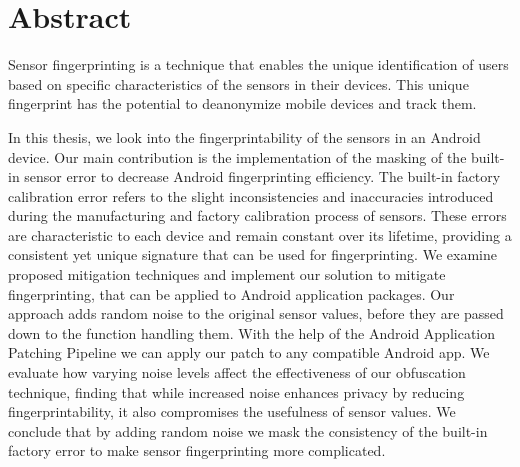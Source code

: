 \documentclass[11pt,
  oneside,openany,    %
]{scrreprt}
\begin{document}









\printthesistitle

\chapter*{Abstract}

Sensor fingerprinting is a technique that enables the unique identification of users based on specific characteristics of the sensors in their devices. 
This unique fingerprint has the potential to deanonymize mobile devices and track them.

In this thesis, we look into the fingerprintability of the sensors in an Android device.
Our main contribution is the implementation of the masking of the built-in sensor error to decrease Android fingerprinting efficiency.
The built-in factory calibration error refers to the slight inconsistencies and inaccuracies introduced during the manufacturing and factory calibration process of sensors. 
These errors are characteristic to each device and remain constant over its lifetime, providing a consistent yet unique signature that can be used for fingerprinting.
We examine proposed mitigation techniques and implement our solution to mitigate fingerprinting, that can be applied to Android application packages.
Our approach adds random noise to the original sensor values, before they are passed down to the function handling them.
With the help of the Android Application Patching Pipeline we can apply our patch to any compatible Android app.
We evaluate how varying noise levels affect the effectiveness of our obfuscation technique, finding that while increased noise enhances privacy by reducing fingerprintability, it also compromises the usefulness of sensor values.
We conclude that by adding random noise we mask the consistency of the built-in factory error to make sensor fingerprinting more complicated.
\end{document}

